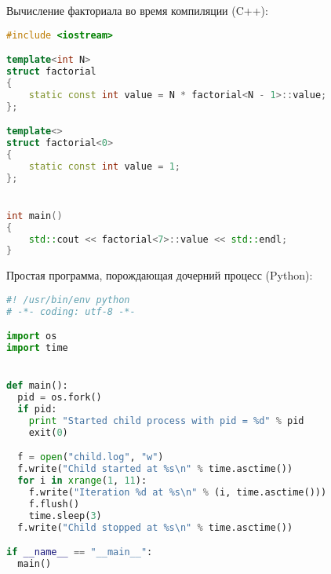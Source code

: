 \documentclass[12pt]{article}
\begin{document}
Вычисление факториала во время компиляции (C++):
\begin{lstlisting}[language=C++]
#include <iostream>

template<int N>
struct factorial
{
	static const int value = N * factorial<N - 1>::value;
};

template<>
struct factorial<0>
{
	static const int value = 1;
};


int main()
{
	std::cout << factorial<7>::value << std::endl;
}
\end{lstlisting}

Простая программа, порождающая дочерний процесс (Python):
\begin{lstlisting}[language=Python]
#! /usr/bin/env python
# -*- coding: utf-8 -*-

import os
import time


def main():
  pid = os.fork()
  if pid:
    print "Started child process with pid = %d" % pid
    exit(0)

  f = open("child.log", "w")
  f.write("Child started at %s\n" % time.asctime())
  for i in xrange(1, 11):
    f.write("Iteration %d at %s\n" % (i, time.asctime()))
    f.flush()
    time.sleep(3)
  f.write("Child stopped at %s\n" % time.asctime())

if __name__ == "__main__":
  main()
\end{lstlisting}
\end{document}

